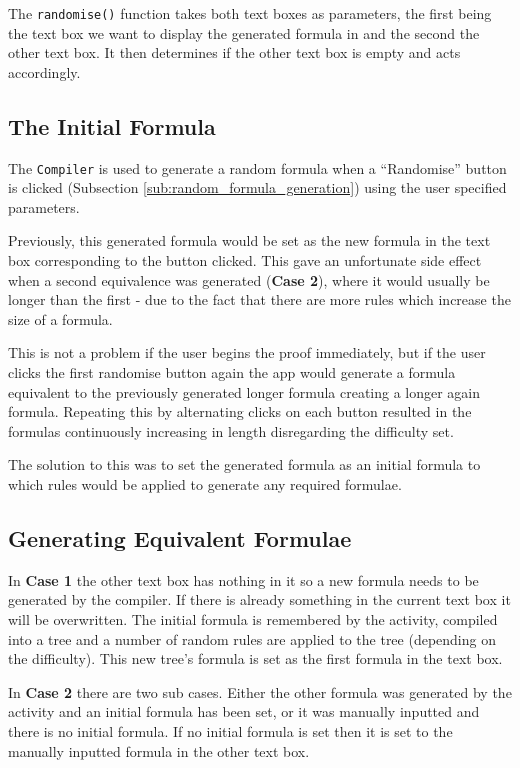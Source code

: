 \documentclass[draft]{report}
\begin{document}
The {\tt randomise()} function takes both text boxes as parameters, the first being the text box we want to display the generated formula in and the second the other text box. It then determines if the other text box is empty and acts accordingly.

\subsection{The Initial Formula}

The {\tt Compiler} is used to generate a random formula when a ``Randomise'' button is clicked (Subsection \ref{sub:random_formula_generation}) using the user specified parameters.

Previously, this generated formula would be set as the new formula in the text box corresponding to the button clicked. This gave an unfortunate side effect when a second equivalence was generated (\textbf{Case 2}), where it would usually be longer than the first - due to the fact that there are more rules which increase the size of a formula. 

This is not a problem if the user begins the proof immediately, but if the user clicks the first randomise button again the app would generate a formula equivalent to the previously generated longer formula creating a longer again formula. Repeating this by alternating clicks on each button resulted in the formulas continuously increasing in length disregarding the difficulty set.

The solution to this was to set the generated formula as an initial formula to which rules would be applied to generate any required formulae.

\subsection{Generating Equivalent Formulae}

In \textbf{Case 1} the other text box has nothing in it so a new formula needs to be generated by the compiler. If there is already something in the current text box it will be overwritten. The initial formula is remembered by the activity, compiled into a tree and a number of random rules are applied to the tree (depending on the difficulty). This new tree's formula is set as the first formula in the text box.

In \textbf{Case 2} there are two sub cases. Either the other formula was generated by the activity and an initial formula has been set, or it was manually inputted and there is no initial formula. If no initial formula is set then it is set to the manually inputted formula in the other text box.
\end{document}
